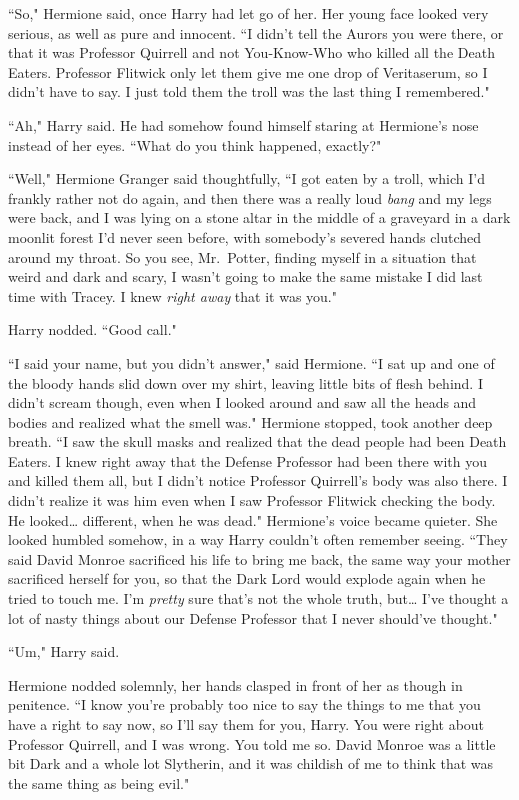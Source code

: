 ``So," Hermione said, once Harry had let go of her. Her young face looked very serious, as well as pure and innocent. ``I didn't tell the Aurors you were there, or that it was Professor Quirrell and not You-Know-Who who killed all the Death Eaters. Professor Flitwick only let them give me one drop of Veritaserum, so I didn't have to say. I just told them the troll was the last thing I remembered."

``Ah," Harry said. He had somehow found himself staring at Hermione's nose instead of her eyes. ``What do you think happened, exactly?"

``Well," Hermione Granger said thoughtfully, ``I got eaten by a troll, which I'd frankly rather not do again, and then there was a really loud \emph{bang} and my legs were back, and I was lying on a stone altar in the middle of a graveyard in a dark moonlit forest I'd never seen before, with somebody's severed hands clutched around my throat. So you see, Mr.~Potter, finding myself in a situation that weird and dark and scary, I wasn't going to make the same mistake I did last time with Tracey. I knew \emph{right away} that it was you."

Harry nodded. ``Good call."

``I said your name, but you didn't answer," said Hermione. ``I sat up and one of the bloody hands slid down over my shirt, leaving little bits of flesh behind. I didn't scream though, even when I looked around and saw all the heads and bodies and realized what the smell was." Hermione stopped, took another deep breath. ``I saw the skull masks and realized that the dead people had been Death Eaters. I knew right away that the Defense Professor had been there with you and killed them all, but I didn't notice Professor Quirrell's body was also there. I didn't realize it was him even when I saw Professor Flitwick checking the body. He looked{\ldots} different, when he was dead." Hermione's voice became quieter. She looked humbled somehow, in a way Harry couldn't often remember seeing. ``They said David Monroe sacrificed his life to bring me back, the same way your mother sacrificed herself for you, so that the Dark Lord would explode again when he tried to touch me. I'm \emph{pretty} sure that's not the whole truth, but{\ldots} I've thought a lot of nasty things about our Defense Professor that I never should've thought."

``Um," Harry said.

Hermione nodded solemnly, her hands clasped in front of her as though in penitence. ``I know you're probably too nice to say the things to me that you have a right to say now, so I'll say them for you, Harry. You were right about Professor Quirrell, and I was wrong. You told me so. David Monroe was a little bit Dark and a whole lot Slytherin, and it was childish of me to think that was the same thing as being evil."

